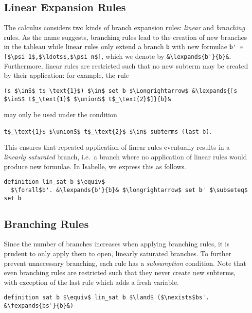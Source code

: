 \documentclass[sigplan,10pt,anonymous,review]{acmart}
\newcommand{\lefttrianglebar}{\mathrel{\tikz[baseline]{\draw (1ex, 0.75ex) -- (0, 1.25ex) -- (0, 0.25ex) -- cycle; \draw (0, 0.75ex) -- (1ex, 0.75ex);}}}
\newcommand{\lefttriangle}{\mathrel{\tikz[baseline]{\draw (1ex, 0.75ex) -- (0, 1.25ex) -- (0, 0.25ex) -- cycle;}}}
\newcommand{\lexpands}[2]{#1 $\lefttriangle$ #2}
\newcommand{\fexpands}[2]{#1 $\lefttrianglebar$ #2}
\newcommand{\unionS}{\sqcup_\text{s}}
\newcommand{\inS}{\in_\text{s}}
\begin{document}
\subsection{Linear Expansion Rules}
The calculus considers two kinds of branch expansion rules: \textit{linear} and \textit{branching} rules.
As the name suggests, branching rules lead to the creation of new branches in the tableau while linear rules only extend a branch \lstinline!b! with new formulae \lstinline[breaklines=true]!b' = [$\psi_1$,$\ldots$,$\psi_n$]!, which we denote by \lstinline!&\lexpands{b'}{b}&!.
Furthermore, linear rules are restricted such that no new subterm may be created by their application:
for example, the rule
\begin{center}
\lstinline!(s $\inS$ t$_\text{1}$) $\in$ set b $\Longrightarrow$ &\lexpands{[s $\inS$ t$_\text{1}$ $\unionS$ t$_\text{2}$]}{b}&!
\end{center}
may only be used under the condition
\begin{center}
  \lstinline!t$_\text{1}$ $\unionS$ t$_\text{2}$ $\in$ subterms (last b)!.
\end{center}
This ensures that repeated application of linear rules eventually results in a \textit{linearly saturated} branch, i.e.\ a branch where no application of linear rules would produce new formulae.
In Isabelle, we express this as follows.
\begin{lstlisting}
definition lin_sat b $\equiv$
  $\forall$b'. &\lexpands{b'}{b}& $\longrightarrow$ set b' $\subseteq$ set b
\end{lstlisting}

\subsection{Branching Rules\label{sec:branching}}
Since the number of branches increases when applying branching rules, it is prudent to only apply them to open, linearly saturated branches.
To further prevent unnecessary branching, each rule has a \textit{subsumption} condition. 
Note that even branching rules are restricted such that they never create new subterms, with exception of the last rule which adds a fresh variable.


\begin{lstlisting}
definition sat b $\equiv$ lin_sat b $\land$ ($\nexists$bs'. &\fexpands{bs'}{b}&)
\end{lstlisting}
\end{document}
